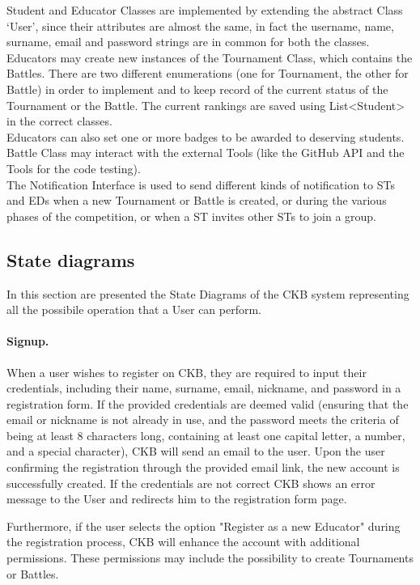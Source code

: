 Student and Educator Classes are implemented by extending the abstract Class ‘User’, since their attributes are almost the same, in fact the username, name, surname, email and password strings are in common for both the classes.\\
Educators may create new instances of the Tournament Class, which contains the Battles. There are two different enumerations (one for Tournament, the other for Battle) in order to implement and to keep record of the current status of the Tournament or the Battle. The current rankings are saved using List<Student> in the correct classes. \\
Educators can also set one or more badges to be awarded to deserving students. Battle Class may interact with the external Tools (like the GitHub API and the Tools for the code testing). \\
The Notification Interface is used to send different kinds of notification to STs and EDs when a new Tournament or Battle is created, or during the various phases of the competition, or when a ST invites other STs to join a group.\\


\subsection{State diagrams}
\label{subsec:state_diagrams}%
In this section are presented the State Diagrams of the CKB system representing all the possibile operation that a User can perform.
\paragraph{Signup.}
When a user wishes to register on CKB, they are required to input their credentials, including their name, surname, email, nickname, and password in a registration form. If the provided credentials are deemed valid (ensuring that the email or nickname is not already in use, and the password meets the criteria of being at least 8 characters long, containing at least one capital letter, a number, and a special character), CKB will send an email to the user. Upon the user confirming the registration through the provided email link, the new account is successfully created. If the credentials are not correct CKB shows an error message to the User and redirects him to the registration form page.

Furthermore, if the user selects the option "Register as a new Educator" during the registration process, CKB will enhance the account with additional permissions. These permissions may include the possibility to create Tournaments or Battles.

